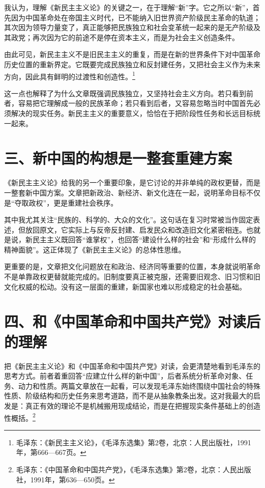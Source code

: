 \documentclass[12pt,a4paper]{ctexart}
\begin{document}
我认为，理解《新民主主义论》的关键之一，在于理解“新”字。它之所以“新”，首先因为中国革命处在帝国主义时代，已不能纳入旧世界资产阶级民主革命的轨道；其次因为领导力量变了，真正能够把民族独立和社会变革统一起来的是无产阶级及其政党；再次因为它的前途不是停在资本主义，而是为社会主义创造条件。

由此可见，新民主主义不是旧民主主义的重复，而是在新的世界条件下对中国革命历史位置的重新界定。它既要完成民族独立和反封建任务，又把社会主义作为未来方向，因此具有鲜明的过渡性和创造性。\footnote{毛泽东：《新民主主义论》，《毛泽东选集》第2卷，北京：人民出版社，1991年，第666—667页。}

这一点也解释了为什么文章既强调民族独立，又坚持社会主义方向。若只看到前者，容易把它理解成一般的民族革命；若只看到后者，又容易忽略当时中国首先必须解决的现实任务。新民主主义的重要意义，恰恰在于把阶段性任务和长远目标统一起来。

\section*{三、新中国的构想是一整套重建方案}

《新民主主义论》给我的另一个重要印象，是它讨论的并非单纯的政权更替，而是一整套新中国方案。文章把新政治、新经济、新文化连在一起，说明革命目标不仅是“夺取政权”，更是重建社会秩序。

其中我尤其关注“民族的、科学的、大众的文化”。这句话在复习时常被当作固定表述，但放回原文，它实际上与反帝反封建、启发民众和改造旧文化紧密相连。也就是说，新民主主义既回答“谁掌权”，也回答“建设什么样的社会”和“形成什么样的精神面貌”。这正体现了《新民主主义论》的总体性思维。

更重要的是，文章把文化问题放在和政治、经济同等重要的位置，本身就说明革命不是单靠政权更替就能完成的。旧制度要真正被克服，还需要旧观念、旧习惯和旧文化权威的松动。没有这一层面的重建，新国家也难以形成稳定的社会基础。

\section*{四、和《中国革命和中国共产党》对读后的理解}

把《新民主主义论》和《中国革命和中国共产党》对读，会更清楚地看到毛泽东的思考方式。前者着重回答“应建立什么样的新中国”，后者系统分析革命对象、任务、动力和性质。两篇文章放在一起看，可以发现毛泽东始终围绕中国社会的特殊性质、阶级结构和历史任务来思考道路，而不是从抽象教条出发。这对我最大的启发是：真正有效的理论不是机械搬用现成结论，而是在把握现实条件基础上的创造性概括。\footnote{毛泽东：《中国革命和中国共产党》，《毛泽东选集》第2卷，北京：人民出版社，1991年，第636—650页。}
\end{document}
